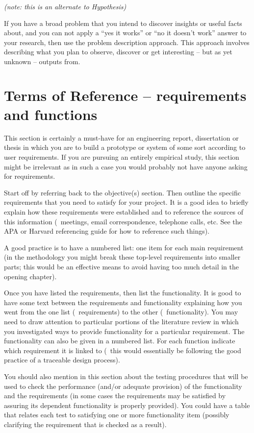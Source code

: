 \emph{(note: this is an alternate to Hypothesis)}

If you have a broad problem that you intend to discover insights or useful facts about, and you can not apply a ``yes it works'' or ``no it doesn't work'' answer to your research, then use the problem description approach.  This approach involves describing what you plan to observe, discover or get interesting -- but as yet unknown -- outputs from.

\section{Terms of Reference -- requirements and functions}

This section is certainly a must-have for an engineering report, dissertation or thesis in which you are to build a prototype or system of some sort according to user requirements.  If you are pursuing an entirely empirical study, this section might be irrelevant as in such a case you would probably not have anyone asking for requirements.

Start off by referring back to the objective(s) section. Then outline the specific requirements that you need to satisfy for your project. It is a good idea to briefly explain how these requirements were established and to reference the sources of this information (\eg~meetings, email correspondence, telephone calls, etc.  See the APA or Harvard referencing guide for how to reference such things).

A good practice is to have a numbered list: one item for each main requirement (in the methodology you might break these top-level requirements into smaller parts; this would be an effective means to avoid having too much detail in the opening chapter).

Once you have listed the requirements, then list the functionality. It is good to have some text between the requirements and functionality explaining how you went from the one list (\ie~requirements) to the other (\ie~functionality).  You may need to draw attention to particular portions of the literature review in which you investigated ways to provide functionality for a particular requirement. The functionality can also be given in a numbered list. For each function indicate which requirement it is linked to (\ie~this would essentially be following the good practice of a traceable design process).

You should also mention in this section about the testing procedures that will be used to check the performance (and/or adequate provision) of the functionality and the requirements (in some cases the requirements may be satisfied by assuring its dependent functionality is properly provided). You could have a table that relates each test to satisfying one or more functionality item (possibly clarifying the requirement that is checked as a result).

